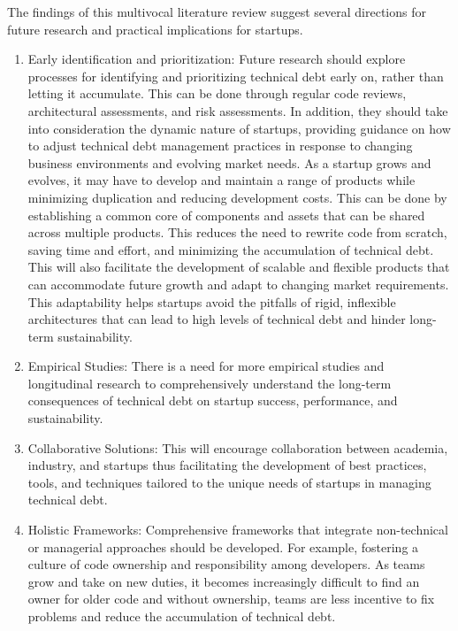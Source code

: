 \documentclass[manuscript]{acmart}
\begin{document}
The findings of this multivocal literature review suggest several directions for future research and practical implications for startups.
\begin{enumerate}
    \item Early identification and prioritization: Future research should explore processes for identifying and prioritizing technical debt early on, rather than letting it accumulate. This can be done through regular code reviews, architectural assessments, and risk assessments. In addition, they should take into consideration the dynamic nature of startups, providing guidance on how to adjust technical debt management practices in response to changing business environments and evolving market needs. As a startup grows and evolves, it may have to develop and maintain a range of products while minimizing duplication and reducing development costs. This can be done by establishing a common core of components and assets that can be shared across multiple products. This reduces the need to rewrite code from scratch, saving time and effort, and minimizing the accumulation of technical debt. This will also facilitate the development of scalable and flexible products that can accommodate future growth and adapt to changing market requirements. This adaptability helps startups avoid the pitfalls of rigid, inflexible architectures that can lead to high levels of technical debt and hinder long-term sustainability.
    \item Empirical Studies: There is a need for more empirical studies and longitudinal research to comprehensively understand the long-term consequences of technical debt on startup success, performance, and sustainability.
    \item Collaborative Solutions: This will encourage collaboration between academia, industry, and startups thus facilitating the development of best practices, tools, and techniques tailored to the unique needs of startups in managing technical debt.
    \item Holistic Frameworks: Comprehensive frameworks that integrate non-technical or managerial approaches should be developed. For example, fostering a culture of code ownership and responsibility among developers. As teams grow and take on new duties, it becomes increasingly difficult to find an owner for older code and without ownership, teams are less incentive to fix problems and reduce the accumulation of technical debt.
\end{enumerate}
\end{document}
